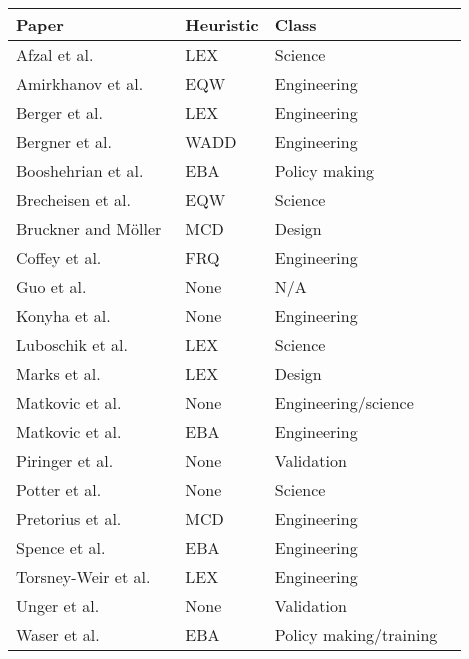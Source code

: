 \begin{supertabular}[c]{@{}llll@{}}
\toprule
Paper & Heuristic & Class\tabularnewline
\midrule
Afzal et al.~\citep{Afzal:2011} & LEX & Science\tabularnewline
Amirkhanov et al.~\citep{Amirkhanov:2010} & EQW & Engineering\tabularnewline
Berger et al.~\citep{Berger:2011} & LEX & Engineering\tabularnewline
Bergner et al.~\citep{Bergner:2013} & WADD & Engineering\tabularnewline
Booshehrian et al.~\citep{Booshehrian:2012} & EBA & Policy making\tabularnewline
Brecheisen et al.~\citep{Brecheisen:2009} & EQW & Science\tabularnewline
Bruckner and M{\"o}ller~\citep{Bruckner:2010} & MCD & Design\tabularnewline
Coffey et al.~\citep{Coffey:2013} & FRQ & Engineering\tabularnewline
Guo et al.~\citep{Guo:2009} & None & N/A\tabularnewline
Konyha et al.~\citep{Konyha:2006} & None & Engineering\tabularnewline
Luboschik et al.~\citep{Luboschik:2014} & LEX & Science\tabularnewline
Marks et al.~\citep{Marks:1997} & LEX & Design\tabularnewline
Matkovic et al.~\citep{Matkovic:2008} & None & Engineering/science\tabularnewline
Matkovic et al.~\citep{Matkovic:2009} & EBA & Engineering\tabularnewline
Piringer et al.~\citep{Piringer:2010} & None & Validation\tabularnewline
Potter et al.~\citep{Potter:2009} & None & Science\tabularnewline
Pretorius et al.~\citep{Pretorius:2011} & MCD & Engineering\tabularnewline
Spence et al.~\citep{Spence:1995} & EBA & Engineering\tabularnewline
Torsney-Weir et al.~\citep{Torsney-Weir:2011} & LEX & Engineering\tabularnewline
Unger et al.~\citep{Unger:2012} & None & Validation\tabularnewline
Waser et al.~\citep{Waser:2010} & EBA & Policy making/training\tabularnewline
\bottomrule
\end{supertabular}

